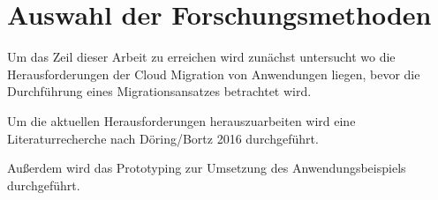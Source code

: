 \section{Auswahl der Forschungsmethoden}

Um das Zeil dieser Arbeit zu erreichen wird zunächst untersucht wo die Herausforderungen der Cloud Migration
von Anwendungen liegen, bevor die Durchführung eines Migrationsansatzes betrachtet wird.

Um die aktuellen Herausforderungen herauszuarbeiten wird eine Literaturrecherche nach Döring/Bortz 2016
durchgeführt.

Außerdem wird das Prototyping zur Umsetzung des Anwendungsbeispiels durchgeführt.